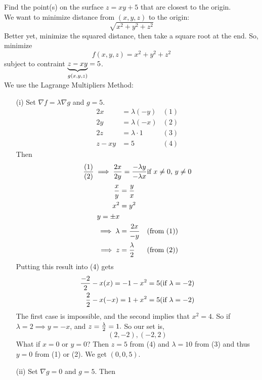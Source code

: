 \documentclass[english, 11pt]{article}
\begin{document}
\begin{exmp}
  Find the point(s) on the surface $z = xy + 5$ that are closest to the origin. \\

  We want to minimize distance from $(x,y,z)$ to the origin:
  \[ \sqrt{x^2 + y^2 + z^2} \]
  Better yet, minimize the squared distance, then take a square root at the end. So, minimize
  \[ f(x,y,z) = x^2 + y^2 + z^2 \]
  subject to contraint $\underbrace{z - xy}_{g(x,y,z)} = 5$. \\

  We use the Lagrange Multipliers Method:

  \begin{itemize}
    \item[(i)] Set $\nabla f = \lambda \nabla g$ and $g = 5$.
    \begin{align*}
      2x & = \lambda(-y) & (1) \\
      2y & = \lambda(-x) & (2) \\
      2z & = \lambda \cdot 1 & (3) \\
      z - xy & = 5 & (4)
    \end{align*}
    Then
    \[ \frac{(1)}{(2)} \implies  \frac{2x}{2y} = \frac{-\lambda y}{-\lambda x} \mbox{if $x \not = 0$, $y \not = 0$} \]
    \begin{align*}
      \frac{x}{y} & = \frac{y}{x} \\
      x^2 & = y^2 \\
      y = \pm x \\
      \implies \lambda &= \frac{2x}{-y} & (\mbox{from (1)}) \\
      \implies z & = \frac{\lambda}{2} & (\mbox{from (2)})
    \end{align*}
    Putting this result into (4) gets
    \begin{align*}
      \frac{-2}{2} - x(x) = -1 - x^2 = 5 & \mbox{(if $\lambda = -2$)} \\
       \frac{2}{2} - x(-x) = 1 + x^2 = 5& \mbox{(if $\lambda = -2$)} \\
    \end{align*}
    The first case is impossible, and the second implies that $x^2 = 4$. So if $\lambda = 2 \implies y = -x$, and $z = \frac{\lambda}{2} = 1.$ So our set is,
    \[ (2, -2), (-2, 2) \]
    What if $x = 0$ or $y = 0$? Then $z = 5$ from (4) and $\lambda = 10$ from (3) and thus $y = 0$ from (1) or (2). We get $(0,0,5)$.
    \item[(ii)] Set $\nabla g = 0$ and $g = 5$. Then
    \begin{align*}

\end{align*}
\end{itemize}
\end{exmp}
\end{document}

